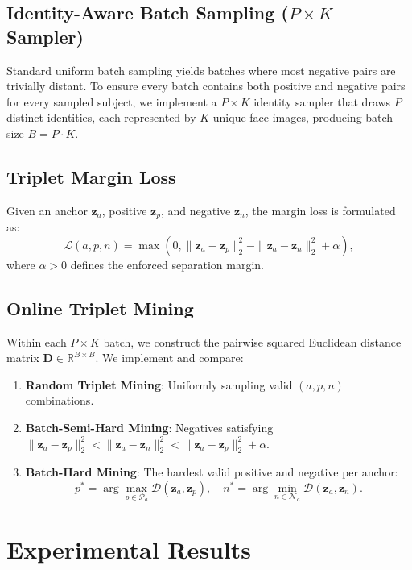 \documentclass{article}
\begin{document}
\subsection{Identity-Aware Batch Sampling ($P \times K$ Sampler)}
Standard uniform batch sampling yields batches where most negative pairs are trivially distant. To ensure every batch contains both positive and negative pairs for every sampled subject, we implement a $P \times K$ identity sampler that draws $P$ distinct identities, each represented by $K$ unique face images, producing batch size $B = P \cdot K$.

\subsection{Triplet Margin Loss}
Given an anchor $\mathbf{z}_a$, positive $\mathbf{z}_p$, and negative $\mathbf{z}_n$, the margin loss is formulated as:
\begin{equation}
    \mathcal{L}(a, p, n) = \max\left(0, \|\mathbf{z}_a - \mathbf{z}_p\|_2^2 - \|\mathbf{z}_a - \mathbf{z}_n\|_2^2 + \alpha\right),
\end{equation}
where $\alpha > 0$ defines the enforced separation margin.

\subsection{Online Triplet Mining}
Within each $P \times K$ batch, we construct the pairwise squared Euclidean distance matrix $\mathbf{D} \in \mathbb{R}^{B \times B}$. We implement and compare:
\begin{enumerate}
    \item \textbf{Random Triplet Mining}: Uniformly sampling valid $(a, p, n)$ combinations.
    \item \textbf{Batch-Semi-Hard Mining}: Negatives satisfying $\|\mathbf{z}_a - \mathbf{z}_p\|_2^2 < \|\mathbf{z}_a - \mathbf{z}_n\|_2^2 < \|\mathbf{z}_a - \mathbf{z}_p\|_2^2 + \alpha$.
    \item \textbf{Batch-Hard Mining}: The hardest valid positive and negative per anchor:
    \begin{equation}
        p^* = \arg\max_{p \in \mathcal{P}_a} \mathcal{D}(\mathbf{z}_a, \mathbf{z}_p), \quad n^* = \arg\min_{n \in \mathcal{N}_a} \mathcal{D}(\mathbf{z}_a, \mathbf{z}_n).
    \end{equation}
\end{enumerate}

\section{Experimental Results}
\label{sec:experiments}
\end{document}
